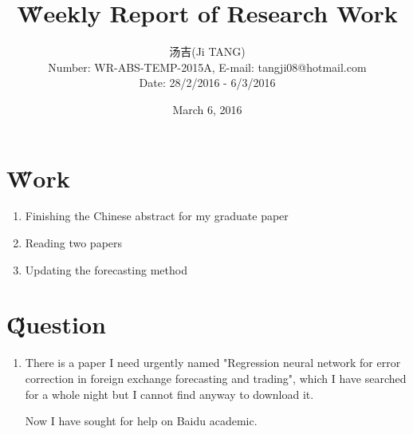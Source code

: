 \documentclass[12pt]{article}
\title{{\H Weekly Report of Research Work\\ }\quad {WR-ABS-TEMP-2015A-No.015}}
\author{汤吉(Ji TANG)\\
               Number: WR-ABS-TEMP-2015A,  E-mail: tangji08@hotmail.com \\
        Date: 28/2/2016 - 6/3/2016}
\date{March 6, 2016}
\begin{document}
  
\maketitle
\pagestyle{fancy}
\fancyhead[LO,RE]{\leftmark} %



\renewcommand{\headrulewidth}{0.4pt}
\renewcommand{\footrulewidth}{0.4pt}



\tableofcontents 
\newpage
\section{\H Work}
\begin{enumerate}
	\item Finishing the Chinese abstract for my graduate paper
	\item Reading two papers
	\item Updating the forecasting method
\end{enumerate}

\section{\H Question}
\begin{enumerate}
	\item There is a paper I need urgently named "Regression neural network for error correction in foreign exchange forecasting and trading", which I have searched for a whole night but I cannot find anyway to download it. 
	
	Now I have sought for help on Baidu academic.
\end{enumerate}
\end{document}
